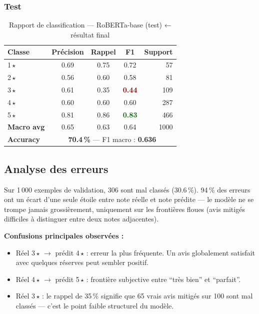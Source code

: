 \documentclass[12pt, a4paper]{article}
\begin{document}
\subsubsection{Test}

\begin{table}[H]
  \centering
  \begin{tabular}{lcccr}
    \toprule
    \textbf{Classe} & \textbf{Précision} & \textbf{Rappel} & \textbf{F1} & \textbf{Support} \\
    \midrule
    1\,$\star$ & 0.69 & 0.75 & 0.72 &  57 \\
    2\,$\star$ & 0.56 & 0.60 & 0.58 &  81 \\
    3\,$\star$ & 0.61 & 0.35 & \textcolor{darkred}{\textbf{0.44}} & 109 \\
    4\,$\star$ & 0.60 & 0.60 & 0.60 & 287 \\
    5\,$\star$ & 0.81 & 0.86 & \textcolor{darkgreen}{\textbf{0.83}} & 466 \\
    \midrule
    \textbf{Macro avg} & 0.65 & 0.63 & 0.64 & 1000 \\
    \midrule
    \textbf{Accuracy} & \multicolumn{4}{c}{\textbf{70.4\,\%} — F1 macro : \textbf{0.636}} \\
    \bottomrule
  \end{tabular}
  \caption{Rapport de classification — RoBERTa-base (test) ← résultat final}
\end{table}

\subsection{Analyse des erreurs}

Sur 1\,000 exemples de validation, 306 sont mal classés (30.6\,\%).
94\,\% des erreurs ont un écart d'une seule étoile entre note réelle et note prédite —
le modèle ne se trompe jamais grossièrement, uniquement sur les frontières floues
(avis mitigés difficiles à distinguer entre deux notes adjacentes).

\textbf{Confusions principales observées :}
\begin{itemize}
  \item Réel 3\,$\star$ $\rightarrow$ prédit 4\,$\star$ : erreur la plus fréquente.
        Un avis globalement satisfait avec quelques réserves peut sembler positif.
  \item Réel 4\,$\star$ $\rightarrow$ prédit 5\,$\star$ : frontière subjective entre
        ``très bien'' et ``parfait''.
  \item Réel 3\,$\star$ : le rappel de 35\,\% signifie que 65 vrais avis mitigés
        sur 100 sont mal classés — c'est le point faible structurel du modèle.
\end{itemize}
\end{document}
